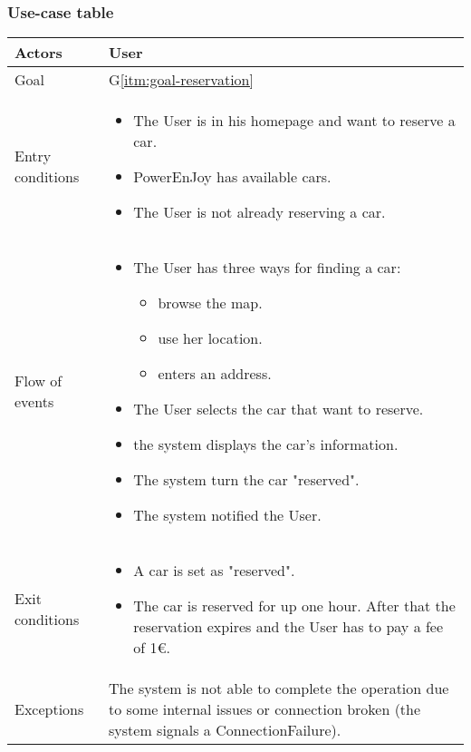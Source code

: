 \subsubsection{Use-case table}
\begin{center}
  \begin{tabular}{ l | p{10cm} }
    \hline
    Actors & User\\ \hline
    Goal & G\ref{itm:goal-reservation}\\ \hline
    Entry conditions & \begin{itemize}
			\item The User is in his homepage and want to reserve a car.
			\item PowerEnJoy has available cars.
			\item The User is not already reserving a car.
\end{itemize}  \\ \hline
    Flow of events &
\begin{itemize}
\item The User has three ways for finding a car:
\begin{itemize}
			\item browse the map.
			\item use her location.
			\item enters an address.
\end{itemize}
\item The User selects the car that want to reserve.
\item the system displays the car's information.%
\item The system turn the car "reserved".%
\item The system notified the User.
\end{itemize} \\ \hline
    Exit conditions &
\begin{itemize}
	\item A car is set as "reserved".
	\item The car is reserved for up one hour. After that the reservation expires and the User has to pay a fee of 1€.
\end{itemize}  \\ \hline
  Exceptions & 

The system is not able to complete the operation due to some internal issues or connection broken (the system signals a ConnectionFailure).%
\\ \hline
  \end{tabular}
\end{center}


